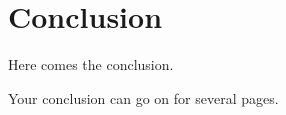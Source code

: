 \chapter{Conclusion}
Here comes the conclusion.

\newpage
Your conclusion can go on for several pages.
